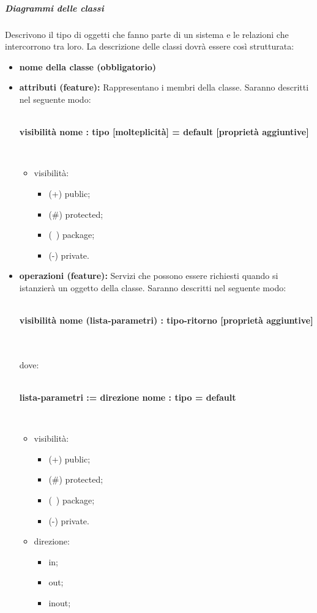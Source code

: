 \subparagraph*{Diagrammi delle classi} Descrivono il tipo di oggetti che fanno parte di un sistema e le relazioni che intercorrono tra loro. La descrizione delle classi dovrà essere così strutturata:
\begin{itemize}
	\item \textbf{nome della classe (obbligatorio)}
	\item \textbf{attributi (feature):} Rappresentano i membri della classe. Saranno descritti nel seguente modo: \\\\ \centerline{\textbf {visibilità nome : tipo [molteplicità] = default [proprietà aggiuntive]}}\\
	\begin{itemize}
		\item visibilità:
		\begin{itemize}
			\item (+) public;
			\item (\#) protected;
			\item (~) package;
			\item (-) private.
		\end{itemize}
	\end{itemize}
	\item \textbf{operazioni (feature):} Servizi che possono essere richiesti quando si istanzierà un oggetto della classe. Saranno descritti nel seguente modo: \\\\ \centerline{\textbf {visibilità nome (lista-parametri) : tipo-ritorno [proprietà aggiuntive]}}\\\\
	dove:
	\\\\ \centerline{\textbf {lista-parametri := direzione nome : tipo = default}}\\
	\begin{itemize}
		\item visibilità:
		\begin{itemize}
			\item (+) public;
			\item (\#) protected;
			\item (~) package;
			\item (-) private.
		\end{itemize}
		\item direzione:
		\begin{itemize}
			\item in;
			\item out;
			\item inout;
		\end{itemize}
	\end{itemize}
\end{itemize}
